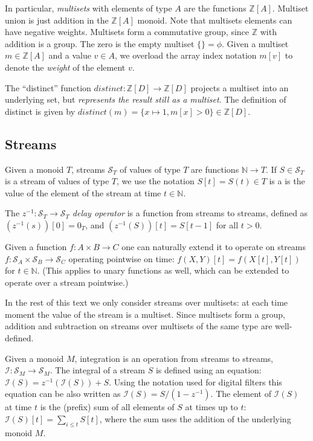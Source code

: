 \documentclass[10pt]{article}
\newcommand{\Z}{\mathbb{Z}}
\newcommand{\N}{\mathbb{N}}
\newcommand{\stream}[1]{\ensuremath{\mathcal{S}_{#1}}}
\newcommand{\zm}{\ensuremath{z^{-1}}}
\newcommand{\I}{\mathcal{I}}
\newcommand{\distinct}{\mathit{distinct}}
\begin{document}
In particular, \emph{multisets} with elements of type $A$ are the
functions $\Z[A]$.  Multiset union is just addition in the $\Z[A]$
monoid.  Note that multisets elements can have negative weights.
Multisets form a commutative group, since $\Z$ with addition is a
group.  The zero is the empty multiset $\{\} = \phi$.  Given a
multiset $m \in \Z[A]$ and a value $v \in A$, we overload the array
index notation $m[v]$ to denote the \emph{weight} of the element $v$.

The ``distinct'' function $\distinct: \Z[D] \rightarrow \Z[D]$ projects
a multiset into an underlying set, but \emph{represents the result
  still as a multiset}.  The definition of distinct is given by
$\distinct(m) = \{ x \mapsto 1, m[x] > 0 \} \in \Z[D]$.

\subsection{Streams}

Given a monoid $T$, streams $\stream{T}$ of values of type $T$ are
functions $\N \rightarrow T$.  If $S \in \stream{T}$ is a stream of
values of type $T$, we use the notation $S[t] = S(t) \in T$ is a is
the value of the element of the stream at time $t \in \N$.

The $\zm: \stream{T} \rightarrow \stream{T}$ \emph{delay operator} is
a function from streams to streams, defined as $(\zm(s))[0] = 0_T$,
and $(\zm(S))[t] = S[t - 1]$ for all $t > 0$.

Given a function $f: A \times B \rightarrow C$ one can naturally
extend it to operate on streams $f: \stream{A} \times \stream{B}
\rightarrow \stream{C}$ operating pointwise on time: $f(X, Y)[t] =
f(X[t], Y[t])$ for $t \in \N$.  (This applies to unary functions as
well, which can be extended to operate over a stream pointwise.)

In the rest of this text we only consider streams over multisets: at
each time moment the value of the stream is a multiset.  Since
multisets form a group, addition and subtraction on streams over
multisets of the same type are well-defined.

Given a monoid $M$, integration is an operation from streams to
streams, $\I : \stream{M} \rightarrow \stream{M}$.  The integral of a
stream $S$ is defined using an equation: $\I(S) = \zm(\I(S)) + S$.
Using the notation used for digital filters this equation can be also
written as $\I(S) = S / (1 - \zm)$.  The element of $\I(S)$ at time
$t$ is the (prefix) sum of all elements of $S$ at times up to $t$:
$\I(S)[t] = \sum_{i \leq t} S[t]$, where the sum uses the addition of
the underlying monoid $M$.
\end{document}
